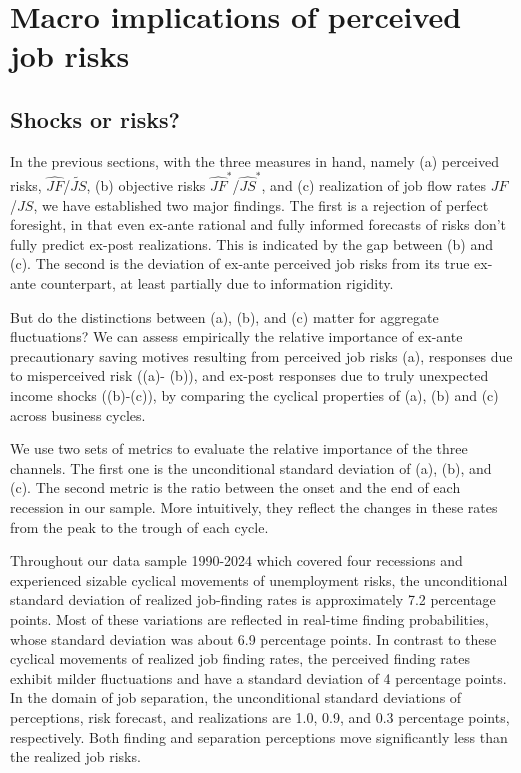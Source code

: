 \section{Macro implications of perceived job risks}

\subsection{Shocks or risks?}

In the previous sections, with the three measures in hand, namely (a) perceived risks, $\widehat{JF}$/$\widetilde{JS}$, (b) objective risks $\widehat{JF}^*$/$\widehat {JS}^*$, and (c) realization of job flow rates $JF$/$JS$, we have established two major findings. The first is a rejection of perfect foresight, in that even ex-ante rational and fully informed forecasts of risks don't fully predict ex-post realizations.  This is indicated by the gap between (b) and (c). The second is the deviation of ex-ante perceived job risks from its true ex-ante counterpart, at least partially due to information rigidity.  

But do the distinctions between (a), (b), and (c) matter for aggregate fluctuations? We can assess empirically the relative importance of ex-ante precautionary saving motives resulting from perceived job risks (a), responses due to misperceived risk ((a)- (b)), and ex-post responses due to truly unexpected income shocks ((b)-(c)), by comparing the cyclical properties of (a), (b) and (c) across business cycles. 

We use two sets of metrics to evaluate the relative importance of the three channels. The first one is the unconditional standard deviation of (a), (b), and (c). The second metric is the ratio between the onset and the end of each recession in our sample. More intuitively, they reflect the changes in these rates from the peak to the trough of each cycle. 

Throughout our data sample 1990-2024 which covered four recessions and experienced sizable cyclical movements of unemployment risks, the unconditional standard deviation of realized job-finding rates is approximately 7.2 percentage points. Most of these variations are reflected in real-time finding probabilities, whose standard deviation was about 6.9 percentage points. In contrast to these cyclical movements of realized job finding rates, the perceived finding rates exhibit milder fluctuations and have a standard deviation of 4 percentage points. In the domain of job separation, the unconditional standard deviations of perceptions, risk forecast, and realizations are 1.0, 0.9, and 0.3 percentage points, respectively. Both finding and separation perceptions move significantly less than the realized job risks. 


